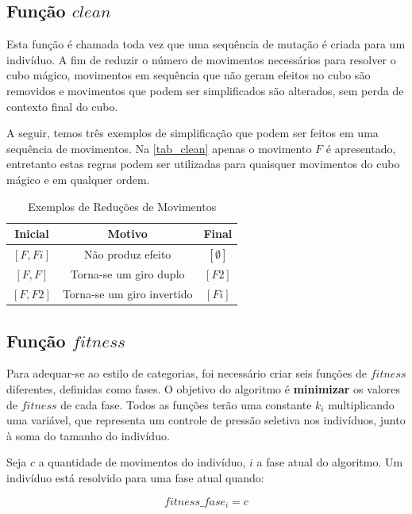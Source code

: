 \documentclass[12pt]{article}
\begin{document}
  \subsection{Função $clean$} \label{clean}
    Esta função é chamada toda vez que uma sequência de mutação é criada para um indivíduo. A fim de reduzir o número de movimentos necessários para resolver o cubo mágico, movimentos em sequência que não geram efeitos no cubo são removidos e movimentos que podem ser simplificados são alterados, sem perda de contexto final do cubo.
    
    A seguir, temos três exemplos de simplificação que podem ser feitos em uma sequência de movimentos. Na \autoref{tab_clean} apenas o movimento $F$ é apresentado, entretanto estas regras podem ser utilizadas para quaisquer movimentos do cubo mágico e em qualquer ordem.

    \begin{table}[ht]
      \centering
      \caption{Exemplos de Reduções de Movimentos} \label{tab_clean}
      \begin{tabular}{|c|c|c|}
        \hline
        \textbf{Inicial} & \textbf{Motivo}              & \textbf{Final}    \\ \hline
            $[F, Fi]$    &  Não produz efeito           &  $[\emptyset]$    \\ \hline
            $[F, F]$     &  Torna-se um giro duplo      &  $[F2]$           \\ \hline
            $[F, F2]$    &  Torna-se um giro invertido  &  $[Fi]$           \\ \hline
      \end{tabular}
    \end{table}

  \subsection{Função $fitness$} \label{fit}
    Para adequar-se ao estilo de categorias, foi necessário criar seis funções de $fitness$ diferentes, definidas como fases. O objetivo do algoritmo é \textbf{minimizar} os valores de $fitness$ de cada fase. Todos as funções terão uma constante $k_i$ multiplicando uma variável, que representa um controle de pressão seletiva nos indivíduos, junto à soma do tamanho do indivíduo.

    Seja $c$ a quantidade de movimentos do indivíduo, $i$ a fase atual do algoritmo. Um indivíduo está resolvido para uma fase atual quando:

    \begin{equation}
    fitness\_fase_i = c
    \end{equation}
\end{document}
